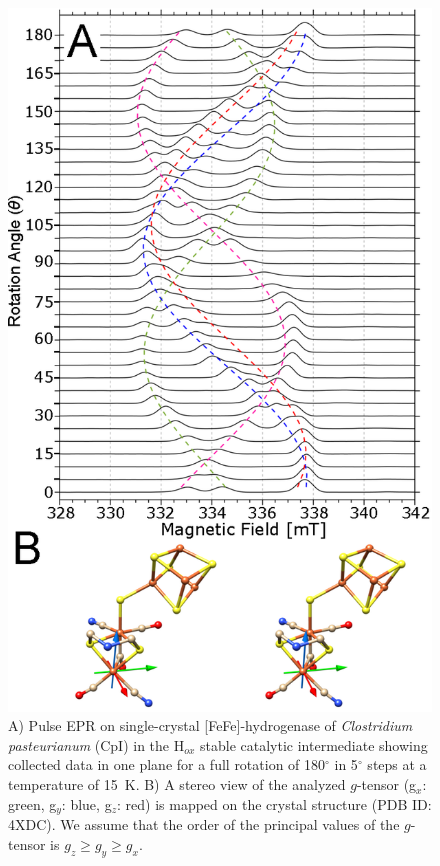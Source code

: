 \begin{figure}[htbp]
\centering
 \includegraphics{Kapitel/Ch5-Images/04-FeFe-xTal-DataBig.eps}
 \caption[Pulse EPR on single-crystal of the H-cluster in FeFe-hydrogenase.]{A) Pulse EPR on single-crystal [FeFe]-hydrogenase of \textit{Clostridium pasteurianum} (CpI) in the H$_{ox}$ stable catalytic intermediate showing collected data in one plane for a full rotation of 180$^{\circ}$ in 5$^{\circ}$ steps at a temperature of 15~K. B) A stereo view of the analyzed $g$-tensor (g$_x$: green, g$_y$: blue, g$_z$: red) is mapped on the crystal structure (PDB ID: 4XDC). We assume that the order of the principal values of the $g$-tensor is $g_z\geq g_y\geq g_x$.} 
 \label{fig:xTalFeFe}
\end{figure}

